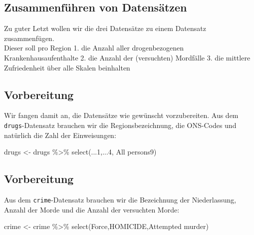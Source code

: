 \documentclass[
]{book}
\newenvironment{Shaded}{\begin{snugshade}}{\end{snugshade}}
\newcommand{\AttributeTok}[1]{\textcolor[rgb]{0.77,0.63,0.00}{#1}}
\newcommand{\DecValTok}[1]{\textcolor[rgb]{0.00,0.00,0.81}{#1}}
\newcommand{\FunctionTok}[1]{\textcolor[rgb]{0.00,0.00,0.00}{#1}}
\newcommand{\NormalTok}[1]{#1}
\newcommand{\OtherTok}[1]{\textcolor[rgb]{0.56,0.35,0.01}{#1}}
\newcommand{\SpecialCharTok}[1]{\textcolor[rgb]{0.00,0.00,0.00}{#1}}
\newcommand{\StringTok}[1]{\textcolor[rgb]{0.31,0.60,0.02}{#1}}
\begin{document}
\hypertarget{zusammenfuxfchren-von-datensuxe4tzen}{%
\subsection{Zusammenführen von Datensätzen}\label{zusammenfuxfchren-von-datensuxe4tzen}}

Zu guter Letzt wollen wir die drei Datensätze zu einem Datensatz zusammenfügen.\\
Dieser soll pro Region
1. die Anzahl aller drogenbezogenen Krankenhausaufenthalte
2. die Anzahl der (versuchten) Mordfälle
3. die mittlere Zufriedenheit über alle Skalen beinhalten

\hypertarget{vorbereitung}{%
\subsection{Vorbereitung}\label{vorbereitung}}

Wir fangen damit an, die Datensätze wie gewünscht vorzubereiten.
Aus dem \texttt{drugs}-Datensatz brauchen wir die Regionsbezeichnung, die ONS-Codes und natürlich die Zahl der Einweisungen:

\begin{Shaded}
\begin{Highlighting}[]
\NormalTok{drugs }\OtherTok{\textless{}{-}}\NormalTok{ drugs }\SpecialCharTok{\%\textgreater{}\%} 
  \FunctionTok{select}\NormalTok{(...}\DecValTok{1}\NormalTok{,...}\DecValTok{4}\NormalTok{, }\StringTok{\textasciigrave{}}\AttributeTok{All persons9}\StringTok{\textasciigrave{}}\NormalTok{)}
\end{Highlighting}
\end{Shaded}

\hypertarget{vorbereitung-1}{%
\subsection{Vorbereitung}\label{vorbereitung-1}}

Aus dem \texttt{crime}-Datensatz brauchen wir die Bezeichnung der Niederlassung, Anzahl der Morde und die Anzahl der versuchten Morde:

\begin{Shaded}
\begin{Highlighting}[]
\NormalTok{crime }\OtherTok{\textless{}{-}}\NormalTok{ crime }\SpecialCharTok{\%\textgreater{}\%} 
  \FunctionTok{select}\NormalTok{(Force,HOMICIDE,}\StringTok{\textasciigrave{}}\AttributeTok{Attempted murder}\StringTok{\textasciigrave{}}\NormalTok{)}
\end{Highlighting}
\end{Shaded}
\end{document}
